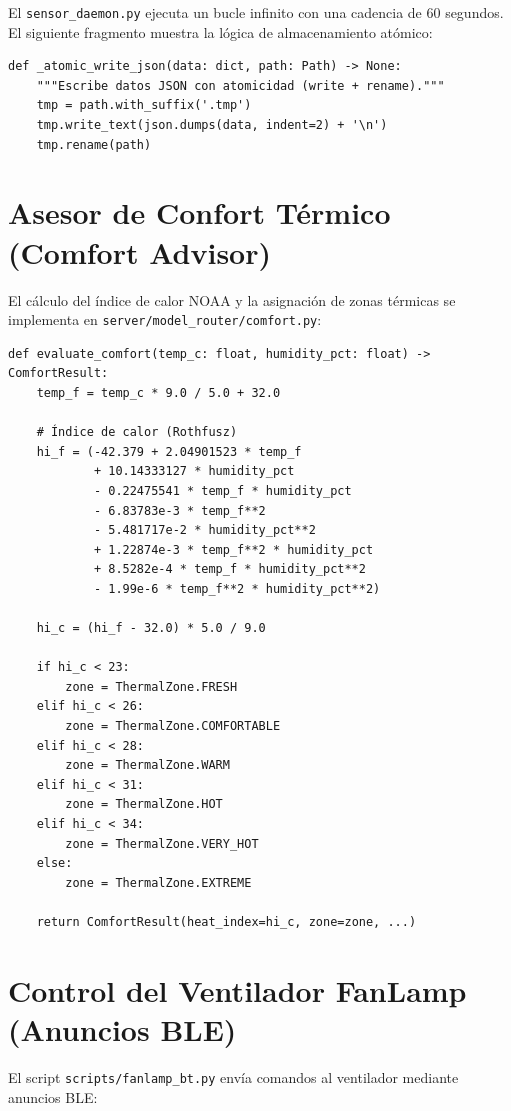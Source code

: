 El \texttt{sensor\_daemon.py} ejecuta un bucle infinito con una cadencia de 60 segundos. El siguiente fragmento muestra la lógica de almacenamiento atómico:

\begin{verbatim}
def _atomic_write_json(data: dict, path: Path) -> None:
    """Escribe datos JSON con atomicidad (write + rename)."""
    tmp = path.with_suffix('.tmp')
    tmp.write_text(json.dumps(data, indent=2) + '\n')
    tmp.rename(path)
\end{verbatim}

\section{Asesor de Confort Térmico (Comfort Advisor)}

El cálculo del índice de calor NOAA y la asignación de zonas térmicas se implementa en \texttt{server/model\_router/comfort.py}:

\begin{verbatim}
def evaluate_comfort(temp_c: float, humidity_pct: float) -> ComfortResult:
    temp_f = temp_c * 9.0 / 5.0 + 32.0
    
    # Índice de calor (Rothfusz)
    hi_f = (-42.379 + 2.04901523 * temp_f
            + 10.14333127 * humidity_pct
            - 0.22475541 * temp_f * humidity_pct
            - 6.83783e-3 * temp_f**2
            - 5.481717e-2 * humidity_pct**2
            + 1.22874e-3 * temp_f**2 * humidity_pct
            + 8.5282e-4 * temp_f * humidity_pct**2
            - 1.99e-6 * temp_f**2 * humidity_pct**2)
    
    hi_c = (hi_f - 32.0) * 5.0 / 9.0
    
    if hi_c < 23:
        zone = ThermalZone.FRESH
    elif hi_c < 26:
        zone = ThermalZone.COMFORTABLE
    elif hi_c < 28:
        zone = ThermalZone.WARM
    elif hi_c < 31:
        zone = ThermalZone.HOT
    elif hi_c < 34:
        zone = ThermalZone.VERY_HOT
    else:
        zone = ThermalZone.EXTREME
    
    return ComfortResult(heat_index=hi_c, zone=zone, ...)
\end{verbatim}

\section{Control del Ventilador FanLamp (Anuncios BLE)}

El script \texttt{scripts/fanlamp\_bt.py} envía comandos al ventilador mediante anuncios BLE:

